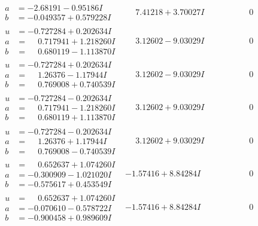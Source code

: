 \documentclass[1p]{elsarticle_modified}
\theoremstyle{definition}
\begin{document}
$$\begin{array}{c|c|c}
\begin{aligned}
a &= -2.68191 - 0.95186 I \\
b &= -0.049357 + 0.579228 I\end{aligned}
 & \phantom{-}7.41218 + 3.70027 I & \phantom{-0.000000 } 0 \\ \hline\begin{aligned}
u &= -0.727284 + 0.202634 I \\
a &= \phantom{-}0.717941 + 1.218260 I \\
b &= \phantom{-}0.680119 - 1.113870 I\end{aligned}
 & \phantom{-}3.12602 - 9.03029 I & \phantom{-0.000000 } 0 \\ \hline\begin{aligned}
u &= -0.727284 + 0.202634 I \\
a &= \phantom{-}1.26376 - 1.17944 I \\
b &= \phantom{-}0.769008 + 0.740539 I\end{aligned}
 & \phantom{-}3.12602 - 9.03029 I & \phantom{-0.000000 } 0 \\ \hline\begin{aligned}
u &= -0.727284 - 0.202634 I \\
a &= \phantom{-}0.717941 - 1.218260 I \\
b &= \phantom{-}0.680119 + 1.113870 I\end{aligned}
 & \phantom{-}3.12602 + 9.03029 I & \phantom{-0.000000 } 0 \\ \hline\begin{aligned}
u &= -0.727284 - 0.202634 I \\
a &= \phantom{-}1.26376 + 1.17944 I \\
b &= \phantom{-}0.769008 - 0.740539 I\end{aligned}
 & \phantom{-}3.12602 + 9.03029 I & \phantom{-0.000000 } 0 \\ \hline\begin{aligned}
u &= \phantom{-}0.652637 + 1.074260 I \\
a &= -0.300909 - 1.021020 I \\
b &= -0.575617 + 0.453549 I\end{aligned}
 & -1.57416 + 8.84284 I & \phantom{-0.000000 } 0 \\ \hline\begin{aligned}
u &= \phantom{-}0.652637 + 1.074260 I \\
a &= -0.070610 - 0.578722 I \\
b &= -0.900458 + 0.989609 I\end{aligned}
 & -1.57416 + 8.84284 I & \phantom{-0.000000 } 0\\

\end{array}$$
\end{document}
